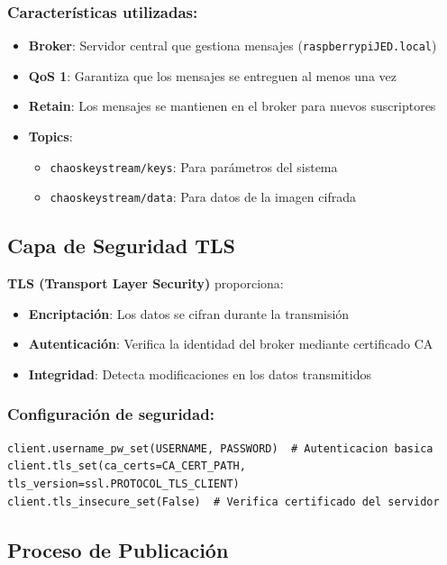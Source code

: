 \documentclass[12pt,a4paper]{article}
\begin{document}
\subsubsection*{Características utilizadas:}
\begin{itemize}
    \item \textbf{Broker}: Servidor central que gestiona mensajes (\texttt{raspberrypiJED.local})
    \item \textbf{QoS 1}: Garantiza que los mensajes se entreguen al menos una vez
    \item \textbf{Retain}: Los mensajes se mantienen en el broker para nuevos suscriptores
    \item \textbf{Topics}:
    \begin{itemize}
        \item \texttt{chaoskeystream/keys}: Para parámetros del sistema
        \item \texttt{chaoskeystream/data}: Para datos de la imagen cifrada
    \end{itemize}
\end{itemize}

\subsection{Capa de Seguridad TLS}

\textbf{TLS (Transport Layer Security)} proporciona:
\begin{itemize}
    \item \textbf{Encriptación}: Los datos se cifran durante la transmisión
    \item \textbf{Autenticación}: Verifica la identidad del broker mediante certificado CA
    \item \textbf{Integridad}: Detecta modificaciones en los datos transmitidos
\end{itemize}

\subsubsection*{Configuración de seguridad:}
\begin{lstlisting}
client.username_pw_set(USERNAME, PASSWORD)  # Autenticacion basica
client.tls_set(ca_certs=CA_CERT_PATH, tls_version=ssl.PROTOCOL_TLS_CLIENT)
client.tls_insecure_set(False)  # Verifica certificado del servidor
\end{lstlisting}

\subsection{Proceso de Publicación}
\end{document}
